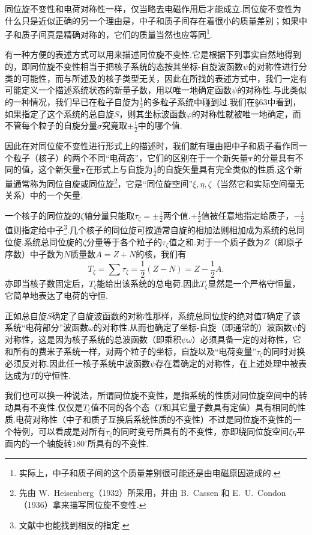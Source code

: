 同位旋不变性和电荷对称性一样，仅当略去电磁作用后才能成立.同位旋不变性为什么只是近似正确的另一个理由是，中子和质子间存在着很小的质量差别；如果中子和质子间真是精确对称的，它们的质量当然也应等同\footnote{实际上，中子和质子间的这个质量差别很可能还是由电磁原因造成的.}.

有一种方便的表述方式可以用来描述同位旋不变性.它是根据下列事实自然地得到的，即同位旋不变性相当于把核子系统的态按其坐标-自旋波函数$\psi$的对称性进行分类的可能性，而与所述及的核子类型无关，因此在所找的表述方式中，我们一定有可能定义一个描述系统状态的新量子数，用以唯一地确定函数$\psi$的对称性.与此类似的一种情况，我们早已在粒子自旋为$\frac{1}{2}$的多粒子系统中碰到过.我们在§63中看到，如果指定了这个系统的总自旋$S$，则其坐标波函数$\varphi$的对称性就被唯一地确定，而不管每个粒子的自旋分量$\sigma$究竟取$\pm\frac{1}{2}$中的哪个值.

因此在对同位旋不变性进行形式上的描述时，我们就有理由把中子和质子看作同一个粒子（核子）的两个不同“电荷态”，它们的区别在于一个新矢量$\boldsymbol{\tau}$的分量具有不同的值，这个新矢量$\boldsymbol{\tau}$在形式上与自旋为$\frac{1}{2}$的自旋矢量具有完全类似的性质.这个新量通常称为同位自旋或同位旋\footnote{先由 W.~Heisenberg（1932）所采用，并由 B.~Cassen 和 E.~U.~Condon（1936）拿来描写同位旋不变性.}，它是“同位旋空间”$\xi,\eta,\zeta$（当然它和实际空间毫无关系）中的一个矢量.

一个核子的同位旋的$\zeta$轴分量只能取$\tau_\zeta=\pm\frac{1}{2}$两个值.$+\frac{1}{2}$值被任意地指定给质子，$-\frac{1}{2}$值则指定给中子\footnote{文献中也能找到相反的指定.}.几个核子的同位旋可按通常自旋的相加法则相加成为系统的总同位旋.系统总同位旋的$\zeta$分量等于各个粒子的$\tau_\zeta$值之和.对于一个质子数为$Z$（即原子序数）中子数为$N$质量数$A=Z+N$的核，我们有
\begin{equation}
  T_\zeta=\sum\tau_\zeta=\frac{1}{2}(Z-N)=Z-\frac{1}{2}A.
\end{equation}
亦即当核子数固定后，$T_\zeta$能给出该系统的总电荷.因此$T_\zeta$显然是一个严格守恒量，它简单地表达了电荷的守恒.

正如总自旋$S$确定了自旋波函数的对称性那样，系统总同位旋的绝对值$T$确定了该系统“电荷部分”波函数$\omega$的对称性.从而也确定了坐标-自旋（即通常的）波函数$\psi$的对称性，这是因为核子系统的总波函数（即乘积$\psi\omega$）必须具备一定的对称性，它和所有的费米子系统一样，对两个粒子的坐标，自旋以及“电荷变量”$\tau_\zeta$的同时对换必须反对称.因此任一核子系统中波函数$\psi$存在着确定的对称性，在上述处理中被表达成为$T$的守恒性.

我们也可以换一种说法，所谓同位旋不变性，是指系统的性质对同位旋空间中的转动具有不变性.仅仅是$T_\zeta$值不同的各个态（$T$和其它量子数具有定值）具有相同的性质.电荷对称性（中子和质子互换后系统性质的不变性）不过是同位旋不变性的一个特例，可以看成是对所有$\tau_\zeta$的同时变号所具有的不变性，亦即绕同位旋空间$\xi\eta$平面内的一个轴旋转$180^\circ$所具有的不变性.

